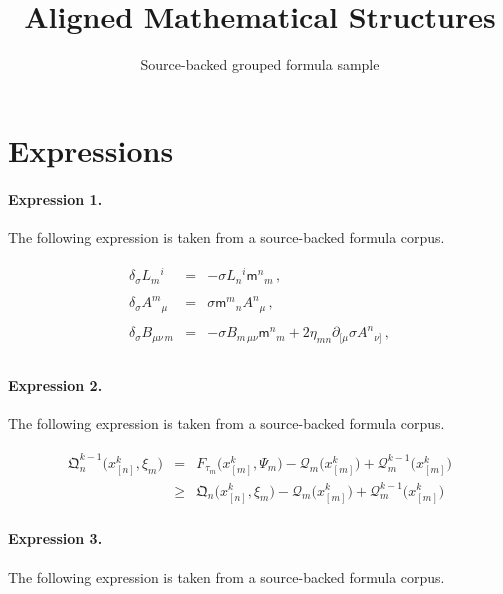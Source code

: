 \documentclass[11pt]{article}
\title{Aligned Mathematical Structures}
\author{Source-backed grouped formula sample}
\date{}
\begin{document}
\maketitle
\section{Expressions}
\paragraph{Expression 1.} The following expression is taken from a source-backed formula corpus.

\begin{align*}\begin{array}{rcl}\delta_{\sigma}L_{m}{}^{i} & = & -\sigma L_{n}{}^{i}\mathsf{m}^{n}{}_{m}\, ,\\& & \\\delta_{\sigma}A^{m}{}_{\mu} & = & \sigma \mathsf{m}^{m}{}_{n} A^{n}{}_{\mu}\, , \\& & \\\delta_{\sigma}B_{\mu\nu\, m} & = & -\sigma B_{m\, \mu\nu}\mathsf{m}^{n}{}_{m}+2\eta_{mn}\partial_{[\mu}\sigma A^{n}{}_{\nu]}\, ,\\\end{array}\end{align*}

\paragraph{Expression 2.} The following expression is taken from a source-backed formula corpus.

\begin{align*} \begin{array}{lll}\mathfrak{Q}_n^{k-1}\Big( x_{[n]}^k, \xi_m\Big) &=& F_{\tau_m}\Big(x_{[m]}^k, \Psi_{m} \Big)-\mathcal{Q}_m\Big( x_{[m]}^k \Big)+\mathcal{Q}_m^{k-1}\Big( x_{[m]}^k \Big) \\ & \geq & \mathfrak{Q}_n \Big(x_{[n]}^k, \xi_{m} \Big)-\mathcal{Q}_m\Big( x_{[m]}^k \Big)+\mathcal{Q}_m^{k-1}\Big( x_{[m]}^k \Big) \end{array}\end{align*}

\paragraph{Expression 3.} The following expression is taken from a source-backed formula corpus.
\end{document}
